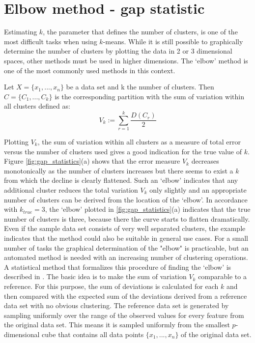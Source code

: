 \clearpage %
\section{Elbow method - gap statistic}
Estimating $k$, the parameter that defines the number of clusters, is one of the most difficult  tasks when using $k$-means. While it is still possible to graphically determine the number of clusters by plotting the data in 2 or 3 dimensional spaces, other methods must be used in higher dimensions. The `elbow' method is one of the most commonly used methods in this context. 

\begin{definition}
Let $X = \{x_1, ..., x_n\}$ be a data set and k the number of clusters. Then $C=\{C_1, ..., C_k\}$ is the corresponding partition with the sum of variation within all clusters defined as: 
	\begin{equation*}
		V_k := \sum_{r=1}^k \frac{D(C_r)}{2}
	\end{equation*}
\end{definition}

 Plotting $V_k$, the sum of variation within all clusters as a measure of total error versus the number of clusters used gives a good indication for the true value of $k$. Figure \ref{fig:gap_statistics}(a) shows that the error measure $V_k$ decreases monotonically as the number of clusters increases but there seems to exist a $k$ from which the decline is clearly flattened. Such an `elbow' indicates that any additional cluster reduces the total variation $V_k$ only slightly and an appropriate number of clusters can be derived from the location of the `elbow'. In accordance with $k_{true}=3$, the `elbow' plotted in \ref{fig:gap_statistics}(a) indicates that the true number of clusters is three, because there the curve starts to flatten dramatically. Even if the sample data set consists of very well separated clusters, the example indicates that the method could also be suitable in general use cases. For a small number of tasks the graphical determination of the "elbow" is practicable, but an automated method is needed with an increasing number of clustering operations. A statistical method that formalizes this procedure of finding the `elbow' is described in \cite{tibshirani2001estimating}.
 The basic idea is to make the sum of variation $V_k$ comparable to a reference. For this purpose, the sum of deviations is calculated for each $k$ and then compared with the expected sum of the deviations 
 derived from a reference data set with no obvious clustering. The reference data set is generated by sampling uniformly over the range of the observed values for every feature from the original data set.
 This means it is sampled uniformly from the smallest $p$-dimensional cube that contains all data points $\{x_1, ..., x_n\}$ of the original data set.  
 
